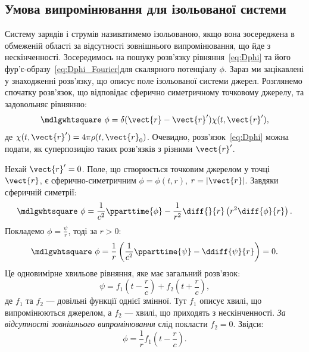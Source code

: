 \subsection*{Умова випромінювання для ізольованої системи}


Систему зарядів і струмів називатимемо ізольованою, якщо вона зосереджена в обмеженій області за відсутності зовнішнього випромінювання, що йде з
нескінченності. Зосередимось на пошуку розв’язку рівняння~\eqref{eq:Dphi} та його фур’є-образу~\eqref{eq:Dphi_Fourier}для скалярного потенціалу $\phi$.
Зараз ми зацікавлені у знаходженні розв’язку, що описує поле ізольованої системи джерел. Розглянемо спочатку розв’язок, що відповідає сферично
симетричному точковому джерелу, та задовольняє рівнянню:
\begin{equation*}
	\mdlgwhtsquare\ \phi = \delta(\vect{r} - \vect{r}')\chi(t, \vect{r}'),
\end{equation*}
де $\chi(t, \vect{r}') = 4\pi\rho(t, \vect{r}_0)$. Очевидно, розв’язок~\eqref{eq:Dphi} можна подати, як суперпозицію
таких розв’язків з різними $\vect{r}'$.

Нехай $\vect{r}' = 0$. Поле, що створюється точковим джерелом у точці $\vect{r}$, є сферично-симетричним $\phi = \phi(t, r)$, $r = |\vect{r}|$. Завдяки
сферичній симетрії:
\begin{equation*}
	\mdlgwhtsquare\ \phi = \frac1{c^2}\pparttime{\phi} - \frac1{r^2} \diff{}{r}\left(r^2 \diff{\phi}{r} \right) .
\end{equation*}
Покладемо $\phi = \frac{\psi}{r}$, тоді за $r>0$:
\begin{equation*}
	\mdlgwhtsquare\ \phi = \frac1r \left( \frac1{c^2}\pparttime{\psi} - \ddiff{\psi}{r}\right) =0 .
\end{equation*}
Це одновимірне хвильове рівняння, яке має загальний розв’язок:
\begin{equation*}
	\psi = f_1\left( t - \frac{r}c \right) + f_2\left( t + \frac{r}c \right),
\end{equation*}
де $f_1$ та $f_2$ --- довільні функції однієї змінної. Тут $f_1$ описує хвилі, що
випромінюються джерелом, а $f_2$ --- хвилі, що приходять з нескінченності. \emph{За
	відсутності зовнішнього випромінювання} слід покласти $f_2=0$. Звідси:
\begin{equation*}
	\phi = \frac1r f_1\left( t - \frac{r}c \right).
\end{equation*}

